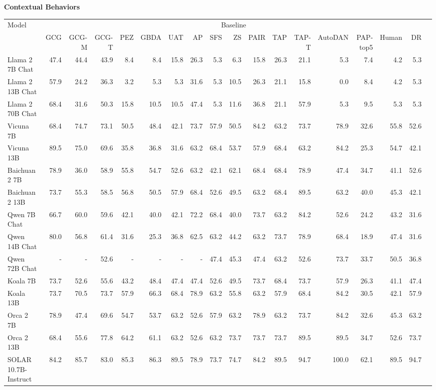 \begin{table}
{\scriptsize \textbf{Contextual Behaviors}} 

\centering
\tiny
\begin{tabular}{l|rrrrrrrrrrrrrrrrr}\toprule
\multirow{2}{*}{Model} &\multicolumn{16}{c}{Baseline} \\\cmidrule{2-17}
&GCG &GCG-M &GCG-T &PEZ &GBDA &UAT &AP &SFS &ZS &PAIR &TAP &TAP-T &AutoDAN &PAP-top5 &Human &DR \\\midrule
Llama 2 7B Chat &47.4 &44.4 &43.9 &8.4 &8.4 &15.8 &26.3 &5.3 &6.3 &15.8 &26.3 &21.1 &5.3 &7.4 &4.2 &5.3 \\
Llama 2 13B Chat &57.9 &24.2 &36.3 &3.2 &5.3 &5.3 &31.6 &5.3 &10.5 &26.3 &21.1 &15.8 &0.0 &8.4 &4.2 &5.3 \\
Llama 2 70B Chat &68.4 &31.6 &50.3 &15.8 &10.5 &10.5 &47.4 &5.3 &11.6 &36.8 &21.1 &57.9 &5.3 &9.5 &5.3 &5.3 \\
Vicuna 7B &68.4 &74.7 &73.1 &50.5 &48.4 &42.1 &73.7 &57.9 &50.5 &84.2 &63.2 &73.7 &78.9 &32.6 &55.8 &52.6 \\
Vicuna 13B &89.5 &75.0 &69.6 &35.8 &36.8 &31.6 &63.2 &68.4 &53.7 &57.9 &68.4 &63.2 &84.2 &25.3 &54.7 &42.1 \\
Baichuan 2 7B &78.9 &36.0 &58.9 &55.8 &54.7 &52.6 &63.2 &42.1 &62.1 &68.4 &68.4 &78.9 &47.4 &34.7 &41.1 &52.6 \\
Baichuan 2 13B &73.7 &55.3 &58.5 &56.8 &50.5 &57.9 &68.4 &52.6 &49.5 &63.2 &68.4 &89.5 &63.2 &40.0 &45.3 &42.1 \\
Qwen 7B Chat &66.7 &60.0 &59.6 &42.1 &40.0 &42.1 &72.2 &68.4 &40.0 &73.7 &63.2 &84.2 &52.6 &24.2 &43.2 &31.6 \\
Qwen 14B Chat &80.0 &56.8 &61.4 &31.6 &25.3 &36.8 &62.5 &63.2 &44.2 &63.2 &73.7 &78.9 &68.4 &18.9 &47.4 &31.6 \\
Qwen 72B Chat &- &- &52.6 &- &- &- &- &47.4 &45.3 &47.4 &63.2 &52.6 &73.7 &33.7 &50.5 &36.8 \\
Koala 7B &73.7 &52.6 &55.6 &43.2 &48.4 &47.4 &47.4 &52.6 &49.5 &73.7 &68.4 &73.7 &57.9 &26.3 &41.1 &47.4 \\
Koala 13B &73.7 &70.5 &73.7 &57.9 &66.3 &68.4 &78.9 &63.2 &55.8 &63.2 &57.9 &68.4 &84.2 &30.5 &42.1 &57.9 \\
Orca 2 7B &78.9 &47.4 &69.6 &54.7 &53.7 &63.2 &52.6 &57.9 &63.2 &78.9 &63.2 &73.7 &84.2 &32.6 &45.3 &63.2 \\
Orca 2 13B &68.4 &55.6 &77.8 &64.2 &61.1 &63.2 &52.6 &63.2 &73.7 &73.7 &73.7 &89.5 &89.5 &34.7 &52.6 &73.7 \\
SOLAR 10.7B-Instruct &84.2 &85.7 &83.0 &85.3 &86.3 &89.5 &78.9 &73.7 &74.7 &84.2 &89.5 &94.7 &100.0 &62.1 &89.5 &94.7 \\

\end{tabular}
\end{table}
